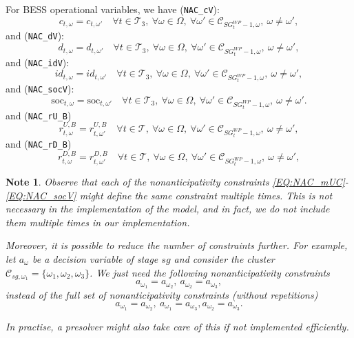 \documentclass{article}
\newcommand{\soc}{\text{soc}}
\newtheorem{note}{Note}[section]
\begin{document}
For BESS operational variables, we have (\verb|NAC_cV|):
\begin{equation} \label{EQ:NAC_cV}
	c_{t, \omega} = c_{t, \omega'} \quad \forall t \in \mathcal{T}_3, \ \forall \omega \in \Omega,\
	\forall \omega' \in \mathcal{C}_{SG^{WP}_t - 1, \omega},\ \omega \neq \omega',
\end{equation}
and (\verb|NAC_dV|):
\begin{equation} \label{EQ:NAC_dV}
	d_{t, \omega} = d_{t, \omega'} \quad \forall t \in \mathcal{T}_3, \ \forall \omega \in \Omega,\
	\forall \omega' \in \mathcal{C}_{SG^{WP}_t - 1, \omega},\ \omega \neq \omega',
\end{equation}
and (\verb|NAC_idV|):
\begin{equation} \label{EQ:NAC_idV}
	id_{t, \omega} = id_{t, \omega'} \quad \forall t \in \mathcal{T}_3, \ \forall \omega \in \Omega,\
	\forall \omega' \in \mathcal{C}_{SG^{WP}_t - 1, \omega},\ \omega \neq \omega',
\end{equation}
and (\verb|NAC_socV|):
\begin{equation} \label{EQ:NAC_socV}
	\soc_{t, \omega} = \soc_{t, \omega'} \quad \forall t \in \mathcal{T}_3, \ \forall \omega \in \Omega,\
	\forall \omega' \in \mathcal{C}_{SG^{WP}_t - 1, \omega},\ \omega \neq \omega'.
\end{equation}
and (\verb|NAC_rU_B|)
\begin{equation} \label{EQ:NAC_rUB}
	r^{U,B}_{t, \omega} = r^{U,B}_{t, \omega'} \quad \forall t \in \mathcal{T},\ \forall \omega \in \Omega,\ \forall \omega' \in \mathcal{C}_{SG^{WP}_t - 1, \omega},\ \omega \neq \omega',
\end{equation}
and (\verb|NAC_rD_B|)
\begin{equation} \label{EQ:NAC_rDB}
	r^{D,B}_{t, \omega} = r^{D,B}_{t, \omega'} \quad \forall t \in \mathcal{T},\ \forall \omega \in \Omega,\ \forall \omega' \in \mathcal{C}_{SG^{WP}_t - 1, \omega},\ \omega \neq \omega',
\end{equation}

\begin{note}
Observe that each of the nonanticipativity constraints \eqref{EQ:NAC_mUC}-\eqref{EQ:NAC_socV} might define the same constraint multiple times. This is not necessary in the implementation of the model, and in fact, we do not include them multiple times in our implementation.
	
Moreover, it is possible to reduce the number of constraints further. For example, let $a_{\omega}$ be a decision variable of stage $sg$ and consider the cluster $\mathcal{C}_{sg, \omega_1} = \{ \omega_1, \omega_2, \omega_3 \}$. We just need the following nonanticipativity constraints 
$$
a_{\omega_1} = a_{\omega_2}, \ a_{\omega_2} = a_{\omega_3},
$$
instead of the full set of nonanticipativity constraints (without repetitions)
$$
a_{\omega_1} = a_{\omega_2}, \ a_{\omega_1} = a_{\omega_3}, a_{\omega_2} = a_{\omega_3}.
$$

In practise, a presolver might also take care of this if not implemented efficiently.	
\end{note}
\end{document}
